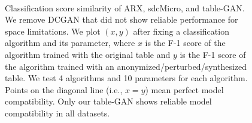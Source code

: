 \begin{figure}[t]
\vspace{-1em}
\\

\vspace{-1em}
\caption{Classification score similarity of ARX, sdcMicro, and table-GAN. We remove DCGAN that did not show reliable performance for space limitations. We plot $(x,y)$ after fixing a classification algorithm and its parameter, where $x$ is the F-1 score of the algorithm trained with the original table and $y$ is the F-1 score of the algorithm trained with an anonymized\slash perturbed\slash synthesized table. We test 4 algorithms and 10 parameters for each algorithm. Points on the diagonal line (i.e., $x=y$) mean perfect model compatibility. Only our table-GAN shows reliable model compatibility in all datasets.}\label{fig:ss}
\end{figure}

